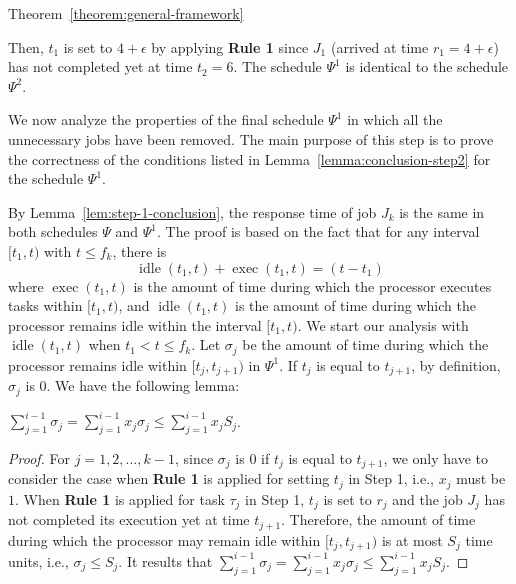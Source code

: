 \begin{appProof}{Theorem~\ref{theorem:general-framework}}
\begin{example}
Then, $t_1$ is set to $4+\epsilon$ by applying {\bf Rule 1} since
$J_1$ (arrived at time $r_1=4+\epsilon$) has not completed yet at time
$t_2=6$.  The schedule $\Psi^1$ is identical to the schedule
$\Psi^2$.
\myendproof
\end{example}


We now analyze the properties of the final schedule $\Psi^1$ in which
all the unnecessary jobs have been removed. The main purpose of this
step is to prove the correctness of the conditions listed in
Lemma~\ref{lemma:conclusion-step2} for the schedule $\Psi^1$. 

By Lemma~\ref{lem:step-1-conclusion}, the response time of job $J_k$ is the same in both schedules $\Psi$ and $\Psi^1$.
The proof is based on the fact that for any interval $[t_1, t)$ with $t \leq f_k$, there is 
\begin{equation}
\label{eq:exec_plus_idle}
\operatorname{idle}(t_1, t) + \operatorname{exec}(t_1, t)  = (t - t_1)
\end{equation}
where $\operatorname{exec}(t_1, t)$ is the amount of time during which the processor executes tasks within $[t_1, t)$, and $\operatorname{idle}(t_1, t)$ is the amount of time during which the processor remains idle within the interval $[t_1, t)$.
We start our analysis with $\operatorname{idle}(t_1, t)$ when $t_1 < t \leq f_k$.
Let $\sigma_j$ be the amount of time during which the processor remains idle within $[t_j, t_{j+1})$ in $\Psi^1$. If $t_j$ is equal to $t_{j+1}$, by definition, $\sigma_j$ is $0$.
We have the following lemma:
\begin{Lemma}
\label{lem:max_idle}
$\sum_{j=1}^{i-1} \sigma_j  = \sum_{j=1}^{i-1} x_j \sigma_j\leq \sum_{j=1}^{i-1} x_j S_j$. %
\end{Lemma}
\begin{proof}
  For $j=1,2,\ldots,k-1$, 
  since $\sigma_j$ is $0$ if $t_j$ is equal to $t_{j+1}$, we only have
  to consider the case when {\bf Rule 1} is applied for setting $t_j$
  in Step 1, i.e., $x_j$ must be $1$.  When {\bf Rule 1} is applied for task $\tau_j$ in Step 1, $t_j$ is set to $r_j$ and
  the job $J_j$ has not completed its execution yet at time $t_{j+1}$. Therefore, the
  amount of time during which the processor may remain idle within
  $[t_j, t_{j+1})$ is at most $S_j$ time units, i.e., $\sigma_j \leq S_j$.   It results that
  $\sum_{j=1}^{i-1} \sigma_j = \sum_{j=1}^{i-1} x_j \sigma_j \leq
  \sum_{j=1}^{i-1} x_j S_j$.
\end{proof}


\end{appProof}
